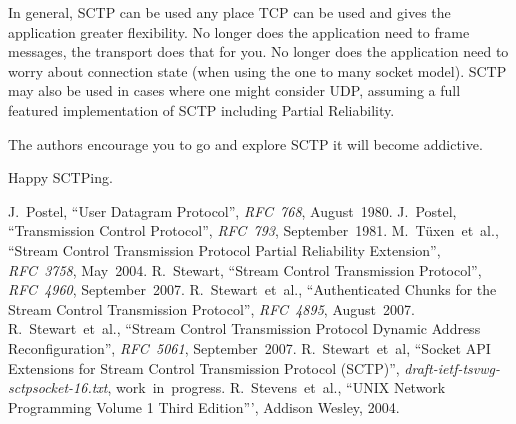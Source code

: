\documentclass[conference]{IEEEtran}
\begin{document}
In general, SCTP can be used any place TCP can be used
and gives the application greater flexibility. No longer
does the application need to frame messages, the transport
does that for you. No longer does the application need
to worry about connection state (when using the one to
many socket model). SCTP may also be used in cases where
one might consider UDP, assuming a full featured implementation
of SCTP including Partial Reliability. 

The authors encourage you to go and explore SCTP it will
become addictive.

Happy SCTPing.

%
%
%

\begin{thebibliography}{9}
  J.~Postel,
  ``User Datagram Protocol'',
  \textit{RFC~768},
  August~1980.
  J.~Postel,
  ``Transmission Control Protocol'',
  \textit{RFC~793},
  September~1981.
  M.~T\"uxen~et~al.,
  ``Stream Control Transmission Protocol Partial Reliability Extension'',
  \textit{RFC~3758},
  May~2004.
  R.~Stewart,
  ``Stream Control Transmission Protocol'',
  \textit{RFC~4960},
  September~2007.
  R.~Stewart~et~al.,
  ``Authenticated Chunks for the Stream Control Transmission Protocol'',
  \textit{RFC~4895},
  August~2007.
  R.~Stewart~et~al.,
  ``Stream Control Transmission Protocol Dynamic Address Reconfiguration'',
  \textit{RFC~5061},
  September~2007.
  R.~Stewart~et~al,
  ``Socket API Extensions for Stream Control Transmission Protocol (SCTP)'',
  \textit{draft-ietf-tsvwg-sctpsocket-16.txt}, work~in~progress.
  R.~Stevens~et~al.,
  ``UNIX Network Programming Volume 1 Third Edition''', Addison Wesley, 2004.
\end{thebibliography}

\end{document}
